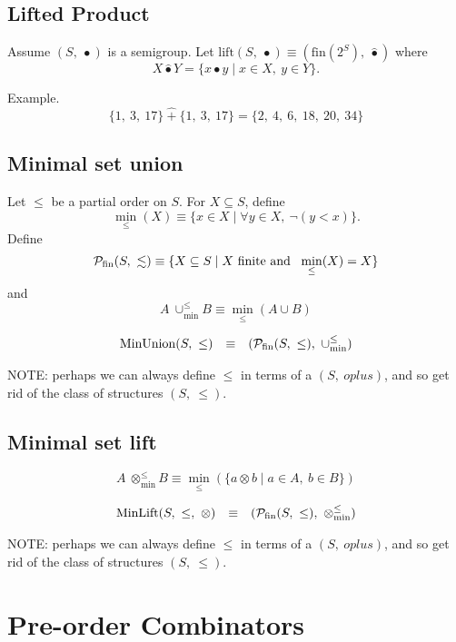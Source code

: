 \documentclass[10pt]{article}
\begin{document}
\subsection{Lifted Product} 

Assume $(S,\ \bullet)$ is a semigroup. 
Let 
$\mathrm{lift}(S,\ \bullet) \equiv (\mathrm{fin}(2^S),\ \hat{\bullet})$ where 
\[ 
X \hat{\bullet} Y  = \{x \bullet y \mid x\in X,\ y\in Y\}. 
\]

Example. 
\[
    \{1,\ 3,\ 17\}\ \hat{+}\ \{1,\ 3,\ 17\} = \{2,\ 4,\ 6,\ 18,\ 20,\ 34\} 
\] 


\subsection{Minimal set union} 

Let $\leq$ be a partial order on $S$. 
For $X \subseteq S$, define 
\[
\min_\leq(X) \equiv \{x \in X \mid \forall y \in X,\  \neg(y < x)\}. 
\] 
Define 
\[
{\cal P}_{\mathrm{fin}}(S,\ \lesssim) 
   \equiv 
\{X \subseteq S\mid \mbox{$X$ finite and \ }\min_\leq(X) = X\} 
\] 
and 
\[
  A\ \cup_{\min}^{\leq} B  \equiv  \min_\leq(A\cup B) 
\] 

\[ 
\begin{array}{rcl} 
\mathrm{MinUnion}(S,\ \leq)
   & \equiv 
   & ({\cal P}_{\mathrm{fin}}(S,\ \leq),\ \cup_{\min}^{\leq})
\end{array} 
\] 


NOTE: perhaps we can always define $\leq$ in terms of a $(S,\ oplus)$, and so 
get rid of the class of structures $(S,\ \leq)$. 

\subsection{Minimal set lift} 

\[
  A\ \otimes_{\min}^{\leq} B  \equiv   \min_\leq(\{a\otimes b\mid a\in A,\ b\in B\})
\] 

\[ 
\begin{array}{rcl} 
\mathrm{MinLift}(S,\ \leq,\ \otimes)
   & \equiv 
   & ({\cal P}_{\mathrm{fin}}(S,\ \leq),\ \otimes_{\min}^{\leq})
\end{array} 
\] 


NOTE: perhaps we can always define $\leq$ in terms of a $(S,\ oplus)$, and so 
get rid of the class of structures $(S,\ \leq)$. 


\section{Pre-order Combinators} 
\end{document}
